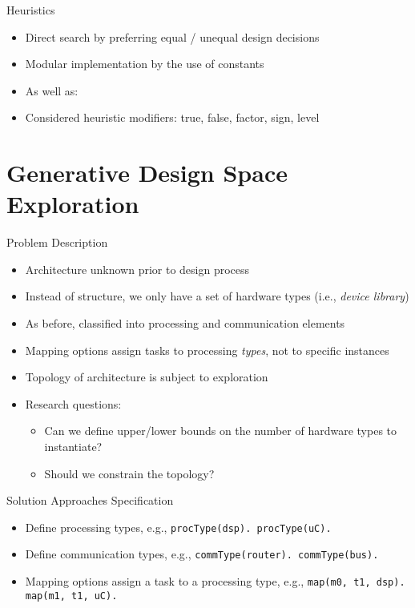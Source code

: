 \documentclass[11pt]{beamer}
\begin{document}
\begin{frame}{Heuristics}
	\begin{itemize}
		\item Direct search by preferring equal / unequal design decisions
		\item Modular implementation by the use of constants
		{\footnotesize}
		\pause
		{\footnotesize}
		\item As well as:
		{\footnotesize}
		\item Considered heuristic modifiers: true, false, factor, sign, level
	\end{itemize}
\end{frame}

\section{Generative Design Space Exploration}

\begin{frame}{Problem Description}
  \begin{itemize}
    \item Architecture unknown prior to design process
    \item Instead of structure, we only have a set of hardware types (i.e., \textit{device library})
    \item As before, classified into processing and communication elements
    \item Mapping options assign tasks to processing \textit{types}, not to specific instances
    \item Topology of architecture is subject to exploration 
    \item Research questions:
    \begin{itemize}
      \item Can we define upper/lower bounds on the number of hardware types to instantiate?
      \item Should we constrain the topology? 
    \end{itemize}
  \end{itemize}
\end{frame}

\begin{frame}{Solution Approaches }
  Specification
  \begin{itemize} 
     \item Define processing types, e.g., \texttt{procType(dsp). procType(uC).}
     \item Define communication types, e.g., \texttt{commType(router). commType(bus).}
     \item Mapping options assign a task to a processing type, e.g., \texttt{map(m0, t1, dsp). map(m1, t1, uC).}
  \end{itemize}
\end{frame}
\end{document}
